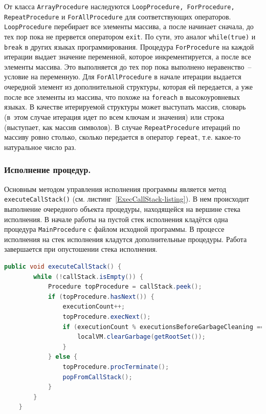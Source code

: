 От класса \texttt{ArrayProcedure} наследуются \texttt{LoopProcedure, ForProcedure, RepeatProcedure} и \texttt{ForAllProcedure} для соответствующих операторов. \texttt{LoopProcedure} перебирает все элементы массива, а после начинает сначала, до тех пор пока не прервется оператором \texttt{exit}. По сути, это аналог \texttt{while(true)} и \texttt{break} в других языках программирования. Процедура \texttt{ForProcedure} на каждой итерации выдает значение переменной, которое инкрементируется, а после все элементы массива. Это выполняется до тех пор пока выполнено неравенство~-- условие на переменную. Для \texttt{ForAllProcedure} в начале  итерации выдается очередной элемент из дополнительной структуры, которая ей передается, а уже после все элементы из массива, что похоже на \texttt{foreach} в высокоуровневых языках. В качестве итерируемой структуры может выступать массив, словарь (в~этом случае итерация идет по всем ключам и значения) или строка (выступает, как массив символов). В случае \texttt{RepeatProcedure} итераций по массиву ровно столько, сколько передается в оператор \texttt{repeat}, т.е. какое-то натуральное число раз.

\subsubsection*{Исполнение процедур.}
Основным методом управления исполнения программы является метод \texttt{executeCallStack()} (см. листинг~\ref{ExecCallStack-listing}). В нем происходит выполнение очередного объекта процедуры, находящейся на вершине стека исполнения.  В начале работы на пустой стек исполнения кладётся одна процедура \texttt{MainProcedure} с файлом исходной программы. В процессе исполнения на стек исполнения кладутся дополнительные процедуры. Работа завершается при опустошении стека исполнения.

\begin{lstlisting}[label=ExecCallStack-listing,caption=Механизм исполнения, frame = none, language = Java]
    public void executeCallStack() {
        while (!callStack.isEmpty()) {
            Procedure topProcedure = callStack.peek();
            if (topProcedure.hasNext()) {
                executionCount++;
                topProcedure.execNext();
                if (executionCount % executionsBeforeGarbageCleaning == 0) {
                    localVM.clearGarbage(getRootSet());
                }
            } else {
                topProcedure.procTerminate();
                popFromCallStack();
            }
        }
    }
\end{lstlisting}


